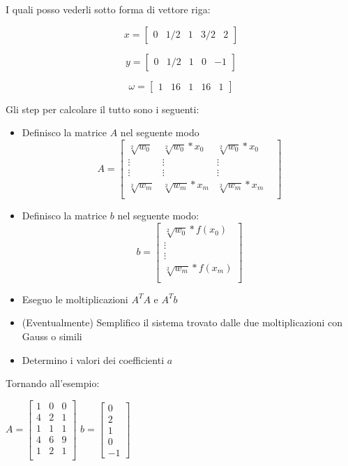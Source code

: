 I quali posso vederli sotto forma di vettore riga:

$$x = 
\begin{bmatrix}
0 & 1/2 & 1 & 3/2 & 2
\end{bmatrix}
$$

$$y = 
\begin{bmatrix}
0 & 1/2 & 1 & 0 & -1
\end{bmatrix}
$$

$$\omega = 
\begin{bmatrix}
1 & 16 & 1 & 16 & 1
\end{bmatrix}
$$

Gli step per calcolare il tutto sono i seguenti:
\begin{itemize}
\item Definisco la matrice $A$ nel seguente modo
$$ A =
\begin{bmatrix}
\sqrt[2]{w_0} & \sqrt[2]{w_0}*x_0 & \sqrt[2]{w_0}*x_0 &\\
\vdots & \vdots & \vdots \\
\vdots  & \vdots & \vdots & \\
\sqrt[2]{w_m} & \sqrt[2]{w_m}*x_m & \sqrt[2]{w_m}*x_m & \\
\end{bmatrix}
$$
\item Definisco la matrice $b$ nel seguente modo:
$$ b =
\begin{bmatrix}
\sqrt[2]{w_0}*f(x_0) \\
\vdots \\
\vdots  \\
\sqrt[2]{w_m}*f(x_m) \\
\end{bmatrix}
$$
\item Eseguo le moltiplicazioni $A^TA$ e $A^Tb$
\item (Eventualmente) Semplifico il sistema trovato dalle due moltiplicazioni con Gauss o simili
\item Determino i valori dei coefficienti $a$
\end{itemize}
\noindent
Tornando all'esempio: \\ 
\begin{center}

$ A = \begin{bmatrix}
1 & 0 & 0 \\
4 & 2 & 1 \\
1 & 1 & 1 \\
4 & 6 & 9 \\
1 & 2 & 1 \\
\end{bmatrix}
$
\hbox{}
$ b = \begin{bmatrix}
0 \\ 2 \\ 1 \\ 0 \\ -1
\end{bmatrix}
$
\end{center}
